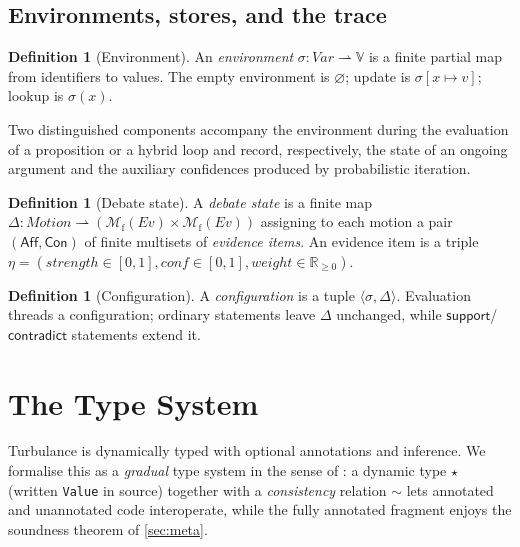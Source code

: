 \documentclass[11pt,a4paper]{article}
\theoremstyle{plain}
\theoremstyle{definition}
\newtheorem{definition}[theorem]{Definition}
\theoremstyle{remark}
\newcommand{\env}{\sigma}
\newcommand{\Val}{\mathbb{V}}
\newcommand{\Unit}{[0,1]}
\newcommand{\dyn}{\star}                                  %
\newcommand{\consistent}{\sim}
\begin{document}
\subsection{Environments, stores, and the trace}
\label{sec:envs}

\begin{definition}[Environment]
An \emph{environment} $\env\colon \mathit{Var}\rightharpoonup\Val$ is a finite
partial map from identifiers to values. The empty environment is $\varnothing$;
update is $\env[x\mapsto v]$; lookup is $\env(x)$.
\end{definition}

Two distinguished components accompany the environment during the evaluation of
a proposition or a hybrid loop and record, respectively, the state of an
ongoing argument and the auxiliary confidences produced by probabilistic
iteration.

\begin{definition}[Debate state]
\label{def:debate}
A \emph{debate state} is a finite map
$\Delta\colon \mathit{Motion}\rightharpoonup
(\mathcal{M}_{\mathrm{f}}(\mathit{Ev})\times\mathcal{M}_{\mathrm{f}}
(\mathit{Ev}))$ assigning to each motion a pair $(\mathsf{Aff},\mathsf{Con})$ of
finite multisets of \emph{evidence items}. An evidence item is a triple
$\eta=(\mathit{strength}\in\Unit, \mathit{conf}\in\Unit, \mathit{weight}\in
\mathbb{R}_{\ge0})$.
\end{definition}

\begin{definition}[Configuration]
A \emph{configuration} is a tuple $\langle \env, \Delta\rangle$. Evaluation
threads a configuration; ordinary statements leave $\Delta$ unchanged, while
$\mathsf{support}$/$\mathsf{contradict}$ statements extend it.
\end{definition}

\section{The Type System}
\label{sec:types}

Turbulance is dynamically typed with optional annotations and inference. We
formalise this as a \emph{gradual} type system in the sense of
\citet{siek2006}: a dynamic type $\dyn$ (written \texttt{Value} in source)
together with a \emph{consistency} relation $\consistent$ lets annotated and
unannotated code interoperate, while the fully annotated fragment enjoys the
soundness theorem of \cref{sec:meta}.
\end{document}
